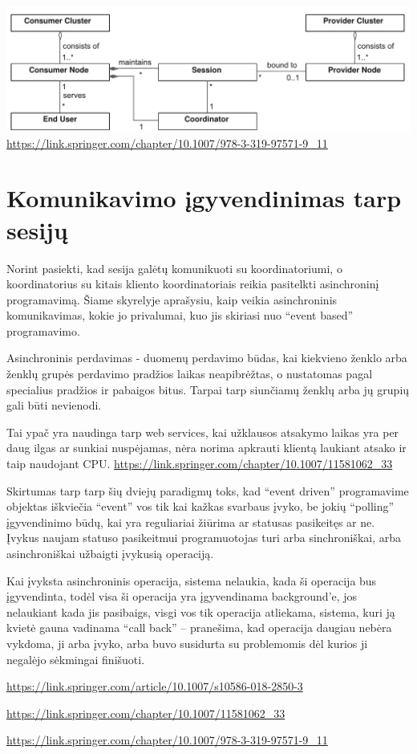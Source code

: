 \documentclass{VUMIFPSkursinis}
\begin{document}
\graphicspath{ {./img/} }
 \includegraphics[width=150mm,scale=0.5]{structure}
\url {https://link.springer.com/chapter/10.1007/978-3-319-97571-9_11}

\section{Komunikavimo įgyvendinimas tarp sesijų}
Norint pasiekti, kad sesija galėtų komunikuoti su koordinatoriumi, o koordinatorius su kitais kliento koordinatoriais reikia pasitelkti asinchroninį programavimą.
Šiame skyrelyje aprašysiu, kaip veikia asinchroninis komunikavimas, kokie jo privalumai, kuo jis skiriasi nuo “event based” programavimo.

Asinchroninis perdavimas - duomenų perdavimo būdas, kai kiekvieno ženklo arba ženklų grupės perdavimo pradžios laikas neapibrėžtas, o nustatomas pagal specialius pradžios ir pabaigos bitus.
Tarpai tarp siunčiamų ženklų arba jų grupių gali būti nevienodi.

Tai ypač yra naudinga tarp web services, kai užklausos atsakymo laikas yra per daug ilgas ar sunkiai nuspėjamas, nėra norima apkrauti klientą laukiant atsako ir taip naudojant CPU.
\url{https://link.springer.com/chapter/10.1007/11581062_33}

Skirtumas tarp tarp šių dviejų paradigmų toks, kad “event driven” programavime objektas iškviečia “event” vos tik kai kažkas svarbaus įvyko, be jokių “polling” įgyvendinimo būdų, kai yra reguliariai žiūrima ar statusas pasikeitęs ar ne. Įvykus naujam statuso pasikeitmui programuotojas turi arba sinchroniškai, arba asinchroniškai užbaigti įvykusią operaciją.

Kai įvyksta asinchroninis operacija, sistema nelaukia, kada ši operacija bus įgyvendinta, todėl visa ši operacija yra įgyvendinama background’e, jos nelaukiant kada jis pasibaigs, visgi vos tik operacija atliekama, sistema, kuri ją kvietė gauna vadinama “call back” – pranešima, kad operacija daugiau nebėra vykdoma, ji arba įvyko, arba buvo susidurta su problemomis dėl kurios ji negalėjo sėkmingai finišuoti.


\url{https://link.springer.com/article/10.1007/s10586-018-2850-3}

\url{https://link.springer.com/chapter/10.1007/11581062_33}

\url{https://link.springer.com/chapter/10.1007/978-3-319-97571-9_11}
\end{document}
